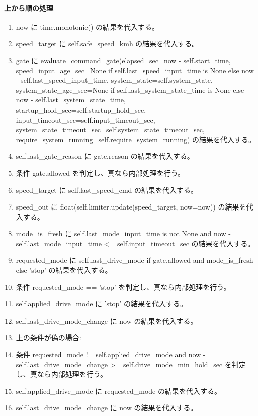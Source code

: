 \documentclass[a4paper,11pt]{article}
\begin{document}
            \paragraph{上から順の処理}
            \begin{enumerate}[leftmargin=1.8em]
            \item now に time.monotonic() の結果を代入する。
\item speed\_target に self.safe\_speed\_kmh の結果を代入する。
\item gate に evaluate\_command\_gate(elapsed\_sec=now - self.start\_time, speed\_input\_age\_sec=None if self.last\_speed\_input\_time is None else now - self.last\_speed\_input\_time, system\_state=self.system\_state, system\_state\_age\_sec=None if self.last\_system\_state\_time is None else now - self.last\_system\_state\_time, startup\_hold\_sec=self.startup\_hold\_sec, input\_timeout\_sec=self.input\_timeout\_sec, system\_state\_timeout\_sec=self.system\_state\_timeout\_sec, require\_system\_running=self.require\_system\_running) の結果を代入する。
\item self.last\_gate\_reason に gate.reason の結果を代入する。
\item 条件 gate.allowed を判定し、真なら内部処理を行う。
\item   speed\_target に self.last\_speed\_cmd の結果を代入する。
\item speed\_out に float(self.limiter.update(speed\_target, now=now)) の結果を代入する。
\item mode\_is\_fresh に self.last\_mode\_input\_time is not None and now - self.last\_mode\_input\_time <= self.input\_timeout\_sec の結果を代入する。
\item requested\_mode に self.last\_drive\_mode if gate.allowed and mode\_is\_fresh else 'stop' の結果を代入する。
\item 条件 requested\_mode == 'stop' を判定し、真なら内部処理を行う。
\item   self.applied\_drive\_mode に 'stop' の結果を代入する。
\item   self.last\_drive\_mode\_change に now の結果を代入する。
\item   上の条件が偽の場合:
\item   条件 requested\_mode != self.applied\_drive\_mode and now - self.last\_drive\_mode\_change >= self.drive\_mode\_min\_hold\_sec を判定し、真なら内部処理を行う。
\item     self.applied\_drive\_mode に requested\_mode の結果を代入する。
\item     self.last\_drive\_mode\_change に now の結果を代入する。

\end{enumerate}
\end{document}
